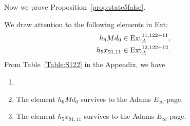 \documentclass{amsart}
\numberwithin{equation}{section}
\begin{document}
Now we prove Proposition~\ref{prop:state5false}.

We draw attention to the following elements in Ext:
\begin{align*}
h_6 M d_0 & \in \mathrm{Ext}_A^{11,122+11}, \\
h_5x_{91,11} & \in \mathrm{Ext}_A^{12,122+12}.
\end{align*}
From Table~\ref{Table:S122} in the Appendix, we have
\begin{fact} \label{fact:stem122}
\begin{enumerate}
    \item[] 
    \item The element $h_6 M d_0$ survives to the Adams $E_\infty$-page.
    \item The element $h_5x_{91,11}$ survives to the Adams $E_\infty$-page.
\end{enumerate}
    
\end{fact}
\end{document}
